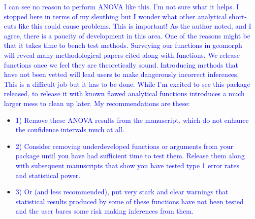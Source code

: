 \documentclass[12pt,letterpaper]{article}
\begin{document}
\begin{enumerate}



\textcolor{blue}{I can see no reason to perform ANOVA like this.  I'm not sure what it helps.  I stopped here in terms of my sleuthing but I wonder what other analytical short-cuts like this could cause problems. This is important!  As the author noted, and I agree, there is a paucity of development in this area.  One of the reasons might be that it takes time to bench test methods.  Surveying our functions in geomorph will reveal many methodological papers cited along with functions.  We release functions once we feel they are theoretically sound.  Introducing methods that have not been vetted will lead users to make dangerously incorrect inferences.  This is a difficult job but it has to be done.  While I'm excited to see this package released, to release it with known flawed analytical functions introduces a much larger mess to clean up later.  My recommendations are these:}

\begin{itemize}
\item \textcolor{blue}{1) Remove these ANOVA results from the manuscript, which do not enhance the confidence intervals much at all.}

\item \textcolor{blue}{2) Consider removing underdeveloped functions or arguments from your package until you have had sufficient time to test them.  Release them along with subsequent manuscripts that show you have tested type 1 error rates and statistical power.}

\item \textcolor{blue}{3) Or (and less recommended), put very stark and clear warnings that statistical results produced by some of these functions have not been tested and the user bares some risk making inferences from them.}


\end{itemize}
\end{enumerate}
\end{document}
